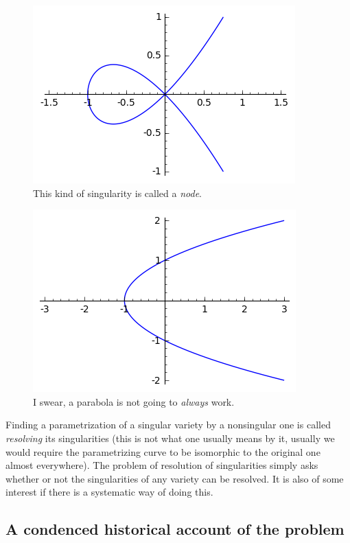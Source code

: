 \documentclass[12pt,a4paper,leqno]{article}
\theoremstyle{plain}
\theoremstyle{definition}
\theoremstyle{remark}
\begin{document}
\begin{figure}\label{node1}
\begin{center}
\includegraphics{pics/node.png}
\caption{This kind of singularity is called a \emph{node}.}
\end{center}
\end{figure}

\begin{figure}\label{nsing2}
\begin{center}
\includegraphics{pics/parabola2.png}
\caption{I swear, a parabola is not going to \emph{always} work.}
\end{center}
\end{figure}

Finding a parametrization of a singular variety by a nonsingular one is called \emph{resolving} its singularities (this is not what one usually means by it, usually we would require the parametrizing curve to be isomorphic to the original one almost everywhere). The problem of resolution of singularities simply asks whether or not the singularities of any variety can be resolved. It is also of some interest if there is a systematic way of doing this.

\subsection{A condenced historical account of the problem}
\end{document}
